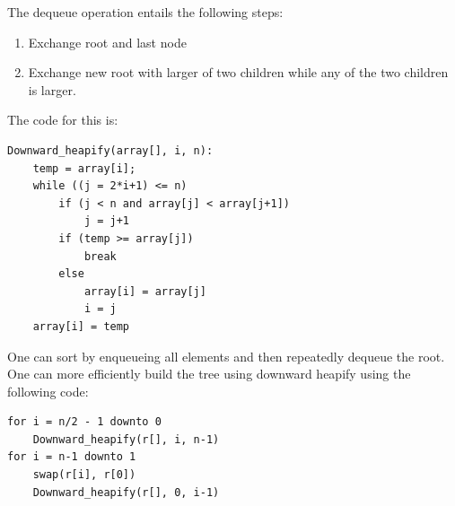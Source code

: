 \documentclass[nobib]{tufte-handout}
\begin{document}
The dequeue operation entails the following steps:
\begin{enumerate}
    \item Exchange root and last node
    \item Exchange new root with larger of two children while any of the two children is
          larger.
\end{enumerate}
The code for this is:
\begin{lstlisting}
Downward_heapify(array[], i, n):
    temp = array[i];
    while ((j = 2*i+1) <= n)
        if (j < n and array[j] < array[j+1])
            j = j+1
        if (temp >= array[j])
            break
        else
            array[i] = array[j]
            i = j
    array[i] = temp
\end{lstlisting}
One can sort by enqueueing all elements and then repeatedly dequeue the root.\\
One can more efficiently build the tree using downward heapify using the
following code:
\begin{lstlisting}
for i = n/2 - 1 downto 0
    Downward_heapify(r[], i, n-1)
for i = n-1 downto 1
    swap(r[i], r[0])
    Downward_heapify(r[], 0, i-1)
\end{lstlisting}
\end{document}
